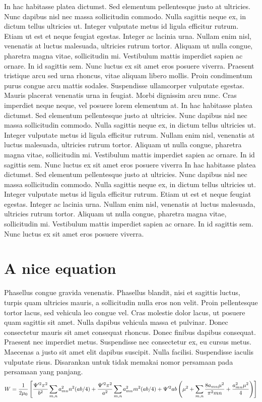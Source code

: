 \documentclass{article}
\begin{document}
In hac habitasse platea dictumst. Sed elementum pellentesque justo at ultricies. Nunc dapibus nisl nec massa sollicitudin commodo. Nulla sagittis neque ex, in dictum tellus ultricies ut. Integer vulputate metus id ligula efficitur rutrum. Etiam ut est et neque feugiat egestas. Integer ac lacinia urna. 
Nullam enim nisl, venenatis at luctus malesuada, ultricies rutrum tortor. Aliquam ut nulla congue, pharetra magna vitae, sollicitudin mi. Vestibulum mattis imperdiet sapien ac ornare. In id sagittis sem. Nunc luctus ex sit amet eros posuere viverra. Praesent tristique arcu sed urna rhoncus, vitae aliquam libero mollis. Proin condimentum purus congue arcu mattis sodales. Suspendisse ullamcorper vulputate egestas. Mauris placerat venenatis urna in feugiat. Morbi dignissim arcu nunc. Cras imperdiet neque neque, vel posuere lorem elementum at. 
In hac habitasse platea dictumst. Sed elementum pellentesque justo at ultricies. Nunc dapibus nisl nec massa sollicitudin commodo. Nulla sagittis neque ex, in dictum tellus ultricies ut. Integer vulputate metus id ligula efficitur rutrum.
Nullam enim nisl, venenatis at luctus malesuada, ultricies rutrum tortor. Aliquam ut nulla congue, pharetra magna vitae, sollicitudin mi. Vestibulum mattis imperdiet sapien ac ornare. In id sagittis sem. Nunc luctus ex sit amet eros posuere viverra
In hac habitasse platea dictumst. Sed elementum pellentesque justo at ultricies. Nunc dapibus nisl nec massa sollicitudin commodo. Nulla sagittis neque ex, in dictum tellus ultricies ut. Integer vulputate metus id ligula efficitur rutrum. Etiam ut est et neque feugiat egestas. Integer ac lacinia urna. 
Nullam enim nisl, venenatis at luctus malesuada, ultricies rutrum tortor. Aliquam ut nulla congue, pharetra magna vitae, sollicitudin mi. Vestibulum mattis imperdiet sapien ac ornare. In id sagittis sem. Nunc luctus ex sit amet eros posuere viverra.

\section{A nice equation}
Phasellus congue gravida venenatis. Phasellus blandit, nisi et sagittis luctus, turpis quam ultricies mauris, a sollicitudin nulla eros non velit. Proin pellentesque tortor lacus, sed vehicula leo congue vel. Cras molestie dolor lacus, ut posuere quam sagittis sit amet. Nulla dapibus vehicula massa et pulvinar. Donec consectetur mauris sit amet consequat rhoncus. Donec finibus dapibus consequat. Praesent nec imperdiet metus. Suspendisse nec consectetur ex, eu cursus metus. Maecenas a justo sit amet elit dapibus suscipit. Nulla facilisi. Suspendisse iaculis vulputate risus. 
Disarankan untuk tidak memakai nomor persamaan pada persamaan yang panjang.
\begin{equation}
W = \frac{1}{2\mu_0}\left[\frac{\Psi'^2 \pi^2}{b^2} \sum_{m,n} a_{mn}^2 n^2 (ab/4) + \frac{\Psi'^2 \pi^2}{a^2} \sum_{m,n} a_{mn}^2 m^2 (ab/4) + \Psi'^2ab\left(\mu^2 + \sum_{m,n} \frac{8a_{mn} \mu^2}{\pi^2 mn} + \frac{a_{mn}^2 \mu^2}{4}\right)\right]\notag
\end{equation}
\end{document}
